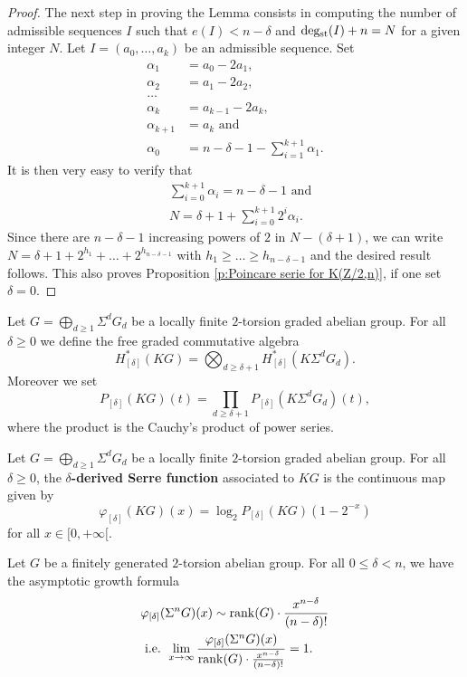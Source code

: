 \begin{proof}
The next step in proving the Lemma consists in computing the number of admissible sequences $I$ such that $e(I)<n-\delta$ and $\operatorname{deg_{st}}(I)+n=N$ for a given integer $N$. Let $I=(a_0,\dots,a_k)$ be an admissible sequence. Set
\begin{align*}
\alpha_1&=a_0-2a_1,\\
\alpha_2&=a_1-2a_2,\\
\dots\\
\alpha_{k}&=a_{k-1}-2a_{k},\\
\alpha_{k+1}&=a_{k}\text{ and}\\
\alpha_0&=n-\delta-1-\sum_{i=1}^{k+1}\alpha_1.
\end{align*}
It is then very easy to verify that
\begin{align*}
&\sum_{i=0}^{k+1}\alpha_i=n-\delta-1\text{ and}\\
&N=\delta+1+\sum_{i=0}^{k+1}2^i\alpha_i.
\end{align*}
Since there are $n-\delta-1$ increasing powers of $2$ in $N-(\delta+1)$, we can write $N=\delta+1+2^{h_1}+\dots+2^{h_{n-\delta-1}}$ with $h_1\geq\dots\geq h_{n-\delta-1}$ and the desired result follows. This also proves Proposition \ref{p:Poincare serie for K(Z/2,n)}, if one set $\delta=0$.
\end{proof}

\begin{defn}
Let $G=\bigoplus_{d\geq1}\Sigma^d G_d$ be a locally finite $2$-torsion graded abelian group. For all $\delta\geq0$ we define the free graded commutative algebra
$$
H^*_{[\delta]}(KG)=\bigotimes_{d\geq\delta+1}H^*_{[\delta]}(K\Sigma^d G_d).
$$ Moreover we set 
$$
P_{[\delta]}(KG)(t)=\prod_{d\geq\delta+1}P_{[\delta]}(K\Sigma^d G_d)(t),
$$ where the product is the Cauchy's product of power series.
\end{defn}

\begin{defn}
Let $G=\bigoplus_{d\geq1}\Sigma^d G_d$ be a locally finite $2$-torsion graded abelian group. For all $\delta\geq0$, the {\bf $\delta$-derived Serre function} associated to $KG$ is the continuous map given by
$$
\varphi_{[\delta]}(KG)(x)=\log_2 P_{[\delta]}(KG)(1-2^{-x})
$$ for all $x\in[0,+\infty[$.
\end{defn}

\begin{lem}\label{l:first step towards Serre improved}
Let $G$ be a finitely generated $2$-torsion abelian group. For all $0\leq\delta<n$, we have the asymptotic growth formula
\begin{align*}
&\varphi_{[\delta]}(\Sigma^n G)(x)\sim \operatorname{rank}(G)\cdot\frac{x^{n-\delta}}{(n-\delta)!}\\ 
&\text{ i.e. }\lim_{x\to\infty}\frac{\varphi_{[\delta]}(\Sigma^n G)(x)}{\operatorname{rank}(G)\cdot\frac{x^{n-\delta}}{(n-\delta)!}}=1.
\end{align*}
\end{lem}

